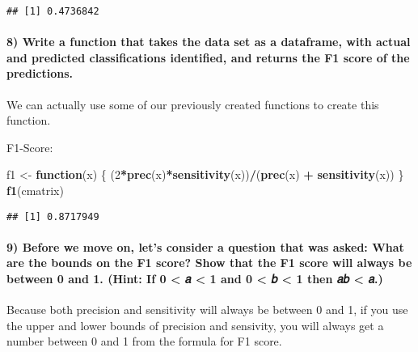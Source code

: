 \documentclass[]{article}
\newenvironment{Shaded}{\begin{snugshade}}{\end{snugshade}}
\newcommand{\KeywordTok}[1]{\textcolor[rgb]{0.13,0.29,0.53}{\textbf{#1}}}
\newcommand{\DecValTok}[1]{\textcolor[rgb]{0.00,0.00,0.81}{#1}}
\newcommand{\StringTok}[1]{\textcolor[rgb]{0.31,0.60,0.02}{#1}}
\newcommand{\ControlFlowTok}[1]{\textcolor[rgb]{0.13,0.29,0.53}{\textbf{#1}}}
\newcommand{\OperatorTok}[1]{\textcolor[rgb]{0.81,0.36,0.00}{\textbf{#1}}}
\newcommand{\NormalTok}[1]{#1}
\let\oldparagraph\paragraph
\renewcommand{\paragraph}[1]{\oldparagraph{#1}\mbox{}}
\begin{document}
\begin{verbatim}
## [1] 0.4736842
\end{verbatim}

\paragraph{8) Write a function that takes the data set as a dataframe,
with actual and predicted classifications identified, and returns the F1
score of the
predictions.}\label{write-a-function-that-takes-the-data-set-as-a-dataframe-with-actual-and-predicted-classifications-identified-and-returns-the-f1-score-of-the-predictions.}

We can actually use some of our previously created functions to create
this function.

F1-Score:

\begin{Shaded}
\begin{Highlighting}[]
\NormalTok{f1 <-}\StringTok{ }\ControlFlowTok{function}\NormalTok{(x) \{}
\NormalTok{  (}\DecValTok{2}\OperatorTok{*}\KeywordTok{prec}\NormalTok{(x)}\OperatorTok{*}\KeywordTok{sensitivity}\NormalTok{(x))}\OperatorTok{/}\NormalTok{(}\KeywordTok{prec}\NormalTok{(x) }\OperatorTok{+}\StringTok{ }\KeywordTok{sensitivity}\NormalTok{(x))}
\NormalTok{\}}
\KeywordTok{f1}\NormalTok{(cmatrix)}
\end{Highlighting}
\end{Shaded}

\begin{verbatim}
## [1] 0.8717949
\end{verbatim}

\paragraph{9) Before we move on, let's consider a question that was
asked: What are the bounds on the F1 score? Show that the F1 score will
always be between 0 and 1. (Hint: If 0 \textless{} 𝑎 \textless{} 1 and 0
\textless{} 𝑏 \textless{} 1 then 𝑎𝑏 \textless{}
𝑎.)}\label{before-we-move-on-lets-consider-a-question-that-was-asked-what-are-the-bounds-on-the-f1-score-show-that-the-f1-score-will-always-be-between-0-and-1.-hint-if-0--1-and-0--1-then--.}

Because both precision and sensitivity will always be between 0 and 1,
if you use the upper and lower bounds of precision and sensivity, you
will always get a number between 0 and 1 from the formula for F1 score.
\end{document}
